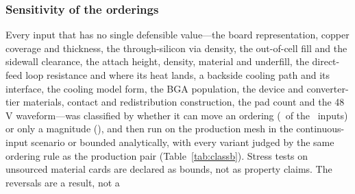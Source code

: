 \documentclass[journal]{IEEEtran}
\begin{document}
\subsubsection{Sensitivity of the orderings}\label{sec:classb}
Every input that has no single defensible value---the board representation, copper coverage
and thickness, the through-silicon via density, the out-of-cell fill and the sidewall clearance,
the attach height, density, material and underfill, the direct-feed loop resistance and where its heat
lands, a backside cooling path and its interface, the cooling model form, the BGA population, the
device and converter-tier materials, contact and redistribution construction, the pad count and
the 48\,V waveform---was classified by whether it can move an ordering (\NbOne\ of the
\NgatesB\ inputs) or only a magnitude (\NbTwo), and then run on the production mesh in the
continuous-input scenario or bounded analytically, with every variant judged by the same
ordering rule as the production pair (Table~\ref{tab:classb}). Stress tests on unsourced
material cards are declared as bounds, not as property claims. The reversals are a result, not a
\end{document}
